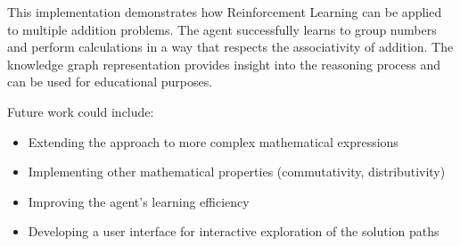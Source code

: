 \documentclass{article}
\begin{document}
This implementation demonstrates how Reinforcement Learning can be applied to multiple addition problems. The agent successfully learns to group numbers and perform calculations in a way that respects the associativity of addition. The knowledge graph representation provides insight into the reasoning process and can be used for educational purposes.

Future work could include:
\begin{itemize}
    \item Extending the approach to more complex mathematical expressions
    \item Implementing other mathematical properties (commutativity, distributivity)
    \item Improving the agent's learning efficiency
    \item Developing a user interface for interactive exploration of the solution paths
\end{itemize}
\end{document}
